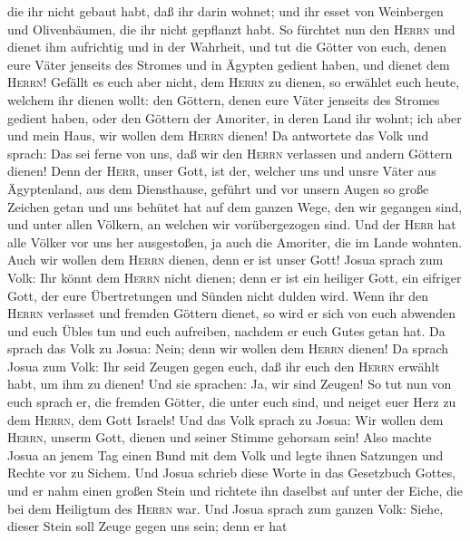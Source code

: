 die ihr nicht gebaut habt, daß ihr darin wohnet; und ihr esset von
Weinbergen und Olivenbäumen, die ihr nicht gepflanzt habt.
 So fürchtet nun den \textsc{Herrn} und dienet ihm
aufrichtig und in der Wahrheit, und tut die Götter von euch, denen eure
Väter jenseits des Stromes und in Ägypten gedient haben, und dienet dem
\textsc{Herrn}!  Gefällt es euch aber nicht, dem
\textsc{Herrn} zu dienen, so erwählet euch heute, welchem ihr dienen
wollt: den Göttern, denen eure Väter jenseits des Stromes gedient haben,
oder den Göttern der Amoriter, in deren Land ihr wohnt; ich aber und
mein Haus, wir wollen dem \textsc{Herrn} dienen!  Da
antwortete das Volk und sprach: Das sei ferne von uns, daß wir den
\textsc{Herrn} verlassen und andern Göttern dienen!  Denn
der \textsc{Herr}, unser Gott, ist der, welcher uns und unsre Väter aus
Ägyptenland, aus dem Diensthause, geführt und vor unsern Augen so große
Zeichen getan und uns behütet hat auf dem ganzen Wege, den wir gegangen
sind, und unter allen Völkern, an welchen wir vorübergezogen sind.
 Und der \textsc{Herr} hat alle Völker vor uns her
ausgestoßen, ja auch die Amoriter, die im Lande wohnten. Auch wir wollen
dem \textsc{Herrn} dienen, denn er ist unser Gott!  Josua
sprach zum Volk: Ihr könnt dem \textsc{Herrn} nicht dienen; denn er ist
ein heiliger Gott, ein eifriger Gott, der eure Übertretungen und Sünden
nicht dulden wird.  Wenn ihr den \textsc{Herrn} verlasset
und fremden Göttern dienet, so wird er sich von euch abwenden und euch
Übles tun und euch aufreiben, nachdem er euch Gutes getan hat.
 Da sprach das Volk zu Josua: Nein; denn wir wollen dem
\textsc{Herrn} dienen!  Da sprach Josua zum Volk: Ihr
seid Zeugen gegen euch, daß ihr euch den \textsc{Herrn} erwählt habt, um
ihm zu dienen! Und sie sprachen: Ja, wir sind Zeugen!  So
tut nun von euch sprach er, die fremden Götter, die unter euch sind, und
neiget euer Herz zu dem \textsc{Herrn}, dem Gott Israels!
 Und das Volk sprach zu Josua: Wir wollen dem
\textsc{Herrn}, unserm Gott, dienen und seiner Stimme gehorsam sein!
 Also machte Josua an jenem Tag einen Bund mit dem Volk
und legte ihnen Satzungen und Rechte vor zu Sichem.  Und
Josua schrieb diese Worte in das Gesetzbuch Gottes, und er nahm einen
großen Stein und richtete ihn daselbst auf unter der Eiche, die bei dem
Heiligtum des \textsc{Herrn} war.  Und Josua sprach zum
ganzen Volk: Siehe, dieser Stein soll Zeuge gegen uns sein; denn er hat
